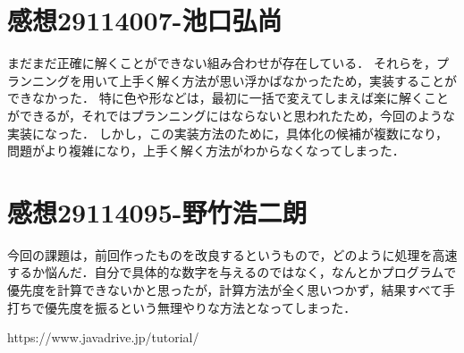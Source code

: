 \documentclass{jarticle}
\begin{document}
\section{感想29114007-池口弘尚}
まだまだ正確に解くことができない組み合わせが存在している．
それらを，プランニングを用いて上手く解く方法が思い浮かばなかったため，実装することができなかった．
特に色や形などは，最初に一括で変えてしまえば楽に解くことができるが，それではプランニングにはならないと思われたため，今回のような実装になった．
しかし，この実装方法のために，具体化の候補が複数になり，問題がより複雑になり，上手く解く方法がわからなくなってしまった．
\section{感想29114095-野竹浩二朗}
今回の課題は，前回作ったものを改良するというもので，どのように処理を高速するか悩んだ．自分で具体的な数字を与えるのではなく，なんとかプログラムで優先度を計算できないかと思ったが，計算方法が全く思いつかず，結果すべて手打ちで優先度を振るという無理やりな方法となってしまった．

\begin{thebibliography}{99}
     https://www.javadrive.jp/tutorial/
\end{thebibliography}
\end{document}

